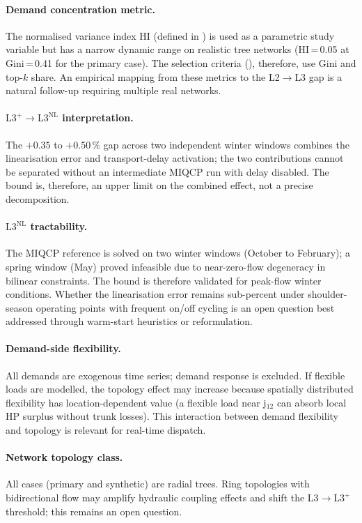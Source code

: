 \documentclass[a4paper,fleqn]{cas-dc}
\newcommand{\Lplus}{\mathrm{L3}^{+}}
\newcommand{\Lnl}{\mathrm{L3}^{\mathrm{NL}}}
\begin{document}
\paragraph{Demand concentration metric.}
The normalised variance index HI (defined in
) is used as a parametric study variable but has a
narrow dynamic range on realistic tree networks (HI\,=\,0.05 at
Gini\,=\,0.41 for the primary case). The selection criteria
(), therefore, use Gini and top-$k$ share. An
empirical mapping from these metrics to the L2$\to$L3 gap is a
natural follow-up requiring multiple real networks.

\paragraph{$\Lplus\!\to\!\Lnl$ interpretation.}
The $+0.35$ to $+0.50\,\%$ gap across two independent winter
windows combines the linearisation error and transport-delay
activation; the two contributions cannot be separated without an
intermediate MIQCP run with delay disabled. The bound is,
therefore, an upper limit on the combined effect, not a precise
decomposition.

\paragraph{$\Lnl$ tractability.}
The MIQCP reference is solved on two winter windows (October to
February); a spring window (May) proved infeasible due to
near-zero-flow degeneracy in bilinear constraints. The bound is
therefore validated for peak-flow winter conditions. Whether the
linearisation error remains sub-percent under shoulder-season
operating points with frequent on/off cycling is an open question
best addressed through warm-start heuristics or reformulation.

\paragraph{Demand-side flexibility.}
All demands are exogenous time series; demand response is
excluded. If flexible loads are modelled, the topology effect may
increase because spatially distributed flexibility has
location-dependent value (a flexible load near j$_{12}$ can
absorb local HP surplus without trunk losses). This interaction
between demand flexibility and topology is relevant for real-time
dispatch.

\paragraph{Network topology class.}
All cases (primary and synthetic) are radial trees. Ring topologies
with bidirectional flow may amplify hydraulic coupling effects and
shift the L3$\to\Lplus$ threshold; this remains an open question.
\end{document}

